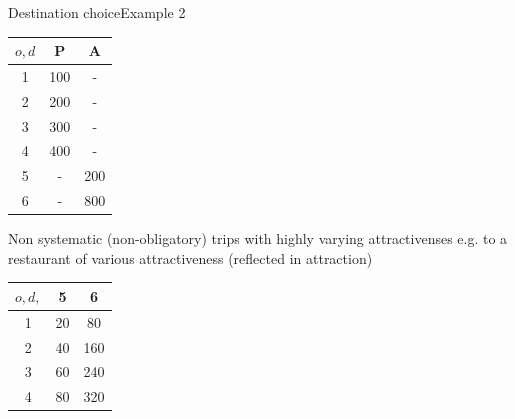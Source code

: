 \documentclass[8pt]{beamer}
\begin{document}
\begin{frame}{Destination choice}{Example 2}
\begin{center}
\begin{minipage}{0.65\textwidth}
        
    \end{minipage}\hfill
    \begin{minipage}{0.25\textwidth}
     \begin{center}
\begin{tabular}{|c|c|c|}
\hline 
{$o,d$} & P & A \\ 
\hline 
1 & 100 & -  \\ 
\hline 
2 & 200 & -  \\ 
\hline 
3 & 300 & -  \\ 
\hline 
4 & 400 & -    \\ 
\hline 
5 & - & 200  \\ 
\hline 
6 & - & 800  \\ 
\hline
\end{tabular}
\end{center}   
    \end{minipage}
\end{center}
\begin{block}{Non systematic (non-obligatory) trips with highly varying attractivenses} 
e.g. to a restaurant of various attractiveness (reflected in attraction)
\end{block}
\begin{center}
\begin{tabular}{|c|c|c|}
\hline 
{$o,d,$}& 5 & 6 \\ 
\hline 
1 & 20 & 80  \\ 
\hline 
2 & 40 & 160 \\ 
\hline 
3 & 60 & 240 \\ 
\hline 
4 & 80 & 320 \\ 
\hline 
\end{tabular} 
\end{center}
\end{frame}
\end{document}
